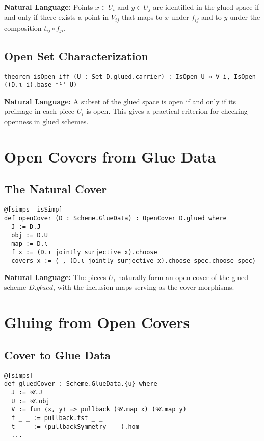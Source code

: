 \documentclass{article}
\theoremstyle{definition}
\begin{document}
\textbf{Natural Language:} Points $x \in U_i$ and $y \in U_j$ are identified in the glued space if and only if there exists a point in $V_{ij}$ that maps to $x$ under $f_{ij}$ and to $y$ under the composition $t_{ij} \circ f_{ji}$.

\subsection{Open Set Characterization}

\begin{lstlisting}
theorem isOpen_iff (U : Set D.glued.carrier) : IsOpen U ↔ ∀ i, IsOpen ((D.ι i).base ⁻¹' U)
\end{lstlisting}

\textbf{Natural Language:} A subset of the glued space is open if and only if its preimage in each piece $U_i$ is open. This gives a practical criterion for checking openness in glued schemes.

\section{Open Covers from Glue Data}

\subsection{The Natural Cover}

\begin{lstlisting}
@[simps -isSimp]
def openCover (D : Scheme.GlueData) : OpenCover D.glued where
  J := D.J
  obj := D.U
  map := D.ι
  f x := (D.ι_jointly_surjective x).choose
  covers x := ⟨_, (D.ι_jointly_surjective x).choose_spec.choose_spec⟩
\end{lstlisting}

\textbf{Natural Language:} The pieces $U_i$ naturally form an open cover of the glued scheme $D.glued$, with the inclusion maps serving as the cover morphisms.

\section{Gluing from Open Covers}

\subsection{Cover to Glue Data}

\begin{lstlisting}
@[simps]
def gluedCover : Scheme.GlueData.{u} where
  J := 𝒰.J
  U := 𝒰.obj
  V := fun ⟨x, y⟩ => pullback (𝒰.map x) (𝒰.map y)
  f _ _ := pullback.fst _ _
  t _ _ := (pullbackSymmetry _ _).hom
  ...
\end{lstlisting}
\end{document}
